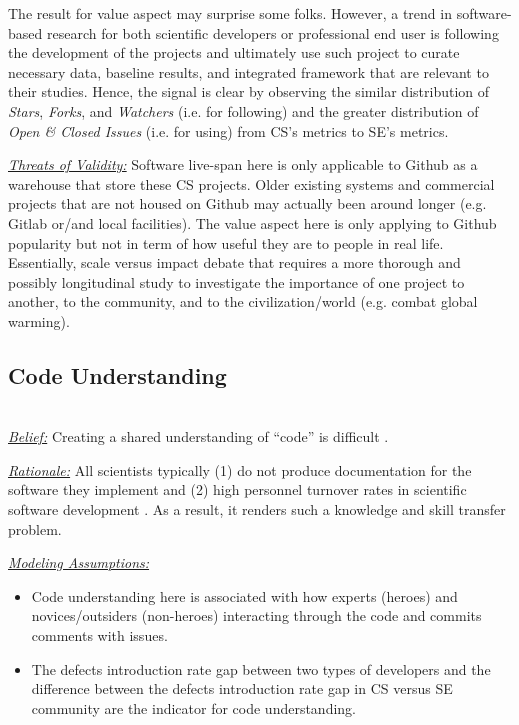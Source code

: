 \documentclass[sigconf,review,anonymous]{acmart}
\newcommand{\bi}{\begin{itemize}}
\newcommand{\ei}{\end{itemize}}
\begin{document}
The result for value aspect may surprise some folks. However, a trend in software-based research for both scientific developers or professional end user is following the development of the projects and ultimately use such project to curate necessary data, baseline results, and integrated framework that are relevant to their studies. Hence, the signal is clear by observing the similar distribution of \textit{Stars}, \textit{Forks}, and \textit{Watchers} (i.e. for following) and the greater distribution of \textit{Open \& Closed Issues} (i.e. for using) from CS's metrics to SE's metrics. 


\noindent \textit{\underline{Threats of Validity:}} Software live-span here is only applicable to Github as a warehouse that store these CS projects. Older existing systems and commercial projects that are not housed on Github may actually been around longer (e.g. Gitlab or/and local facilities). The value aspect here is only applying to Github popularity but not in term of how useful they are to people in real life. Essentially, scale versus impact debate that requires a more thorough and possibly longitudinal study to investigate the importance of one project to another, to the community, and to the civilization/world (e.g. combat global warming). 

\subsection{Code Understanding} ~\\
\noindent \textit{\underline{Belief:}} Creating a shared understanding of ``code'' is difficult \cite{segal07_problem, carver06_hpc, Shull05_parallel, sanders08_risk}. 

\noindent \textit{\underline{Rationale:}} All scientists typically (1) do not produce documentation for the software they implement \cite{segal07_enduser, sanders08_risk} and (2) high personnel turnover rates in scientific software development \cite{carver06_hpc, segal07_problem}. As a result, it renders such a knowledge and skill transfer problem. 

\noindent \textit{\underline{Modeling Assumptions:}} 

\bi
\item Code understanding here is associated with how experts (heroes) and novices/outsiders (non-heroes) interacting through the code and commits comments with issues. 
\item The defects introduction rate gap between two types of developers and the difference between the defects introduction rate gap in CS versus SE community are the indicator for code understanding.  
\ei
\end{document}
